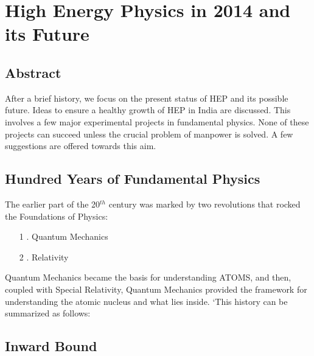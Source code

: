 \chapter{High Energy Physics in 2014 and its Future }\label{chap10}


\smallskip

\section*{Abstract}
After a brief history, we focus on the present status of HEP
and its possible future. Ideas to ensure a healthy growth of HEP in India are
discussed. This involves a few major experimental projects in fundamental
physics. None of these projects can succeed unless the crucial problem of
manpower is solved. A few suggestions are offered towards this aim. 

\section*{Hundred Years of Fundamental Physics} 

The earlier part of the 20$^{th}$ century was marked by two revolutions that
rocked the Foundations of Physics:
\begin{itemize}
\item[1]. Quantum Mechanics
\item[2]. Relativity 
\end{itemize}

Quantum Mechanics became the basis for understanding ATOMS, and
then, coupled with Special Relativity, Quantum Mechanics provided the
framework for understanding the atomic nucleus and what lies inside. ‘This
history can be summarized as follows: 

\section{Inward Bound} 


